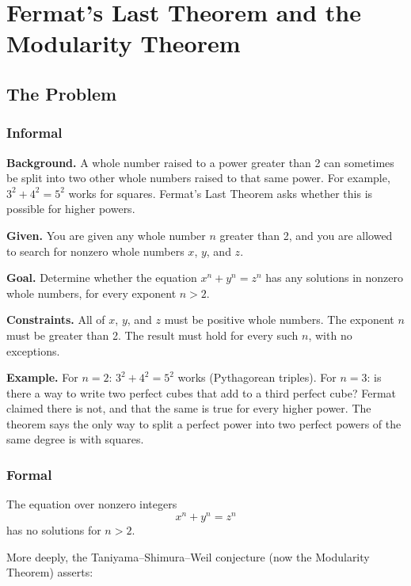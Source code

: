 \let\LocalMacro\relax

\chapter{Fermat's Last Theorem and the Modularity Theorem}

\section{The Problem}

\subsection{Informal}

\textbf{Background.} A whole number raised to a power greater than 2 can sometimes be split into two other whole numbers raised to that same power. For example, $3^2 + 4^2 = 5^2$ works for squares. Fermat's Last Theorem asks whether this is possible for higher powers.

\textbf{Given.} You are given any whole number $n$ greater than 2, and you are allowed to search for nonzero whole numbers $x$, $y$, and $z$.

\textbf{Goal.} Determine whether the equation $x^n + y^n = z^n$ has any solutions in nonzero whole numbers, for every exponent $n > 2$.

\textbf{Constraints.} All of $x$, $y$, and $z$ must be positive whole numbers. The exponent $n$ must be greater than 2. The result must hold for every such $n$, with no exceptions.

\textbf{Example.} For $n = 2$: $3^2 + 4^2 = 5^2$ works (Pythagorean triples). For $n = 3$: is there a way to write two perfect cubes that add to a third perfect cube? Fermat claimed there is not, and that the same is true for every higher power. The theorem says the only way to split a perfect power into two perfect powers of the same degree is with squares.

\subsection{Formal}
The equation over nonzero integers
\begin{equation}
x^n + y^n = z^n
\end{equation}
has no solutions for $n > 2$.

More deeply, the Taniyama--Shimura--Weil conjecture (now the Modularity Theorem) asserts:

